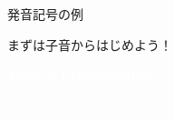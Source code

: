 \documentclass[aspectratio=169, xcolor={dvipsnames,table}]{beamer}
\begin{document}
\begin{frame}[plain]{発音記号の例}
\begin{description}
          \hspace{7pt} \hspace{7pt}

          \hspace{7pt} \hspace{7pt} \hspace{7pt}

          \hspace{7pt} \hspace{7pt} \hspace{7pt} 
  \end{description}
\end{frame}
\begin{frame}[plain]
  \Large
  \centering
  まずは子音からはじめよう！
\end{frame}
\begin{frame}
  \centering
  \textcolor{white}{\Huge\bfseries Today's Pronunciation}

  \vspace{30pt}

  \textcolor{white}{\Huge\bfseries {}, }
\end{frame}
\end{document}
